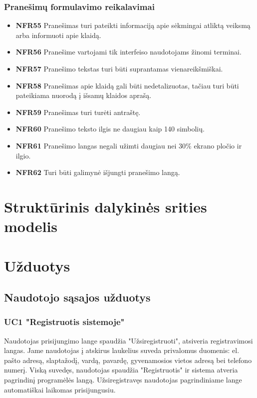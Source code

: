 \documentclass{VUMIFPSbakalaurinis}
\begin{document}
\subsubsection{Pranešimų formulavimo reikalavimai}
\begin{itemize}
	\item \textbf{NFR55} Pranešimas turi pateikti informaciją apie sėkmingai atliktą veiksmą arba informuoti apie klaidą.
	\item \textbf{NFR56} Pranešime vartojami tik interfeiso naudotojams žinomi terminai.
	\item \textbf{NFR57} Pranešimo tekstas turi būti suprantamas vienareikšmiškai.
	\item \textbf{NFR58} Pranešimas apie klaidą gali būti nedetalizuotas, tačiau turi būti pateikiama nuorodą į išsamų klaidos aprašą.
	\item \textbf{NFR59} Pranešimas turi turėti antraštę.
	\item \textbf{NFR60} Pranešimo teksto ilgis ne daugiau kaip 140 simbolių.
	\item \textbf{NFR61} Pranešimo langas negali užimti daugiau nei 30\% ekrano pločio ir ilgio.
	\item \textbf{NFR62} Turi būti galimynė išjungti pranešimo langą.
\end{itemize}

\section{Struktūrinis dalykinės srities modelis}

\section{Užduotys}
\subsection{Naudotojo sąsajos užduotys}
\subsubsection{UC1 "Registruotis sistemoje"}
Naudotojas prisijungimo lange spaudžia "Užsiregistruoti", atsiveria registravimosi langas. Jame naudotojas į atskirus laukelius suveda privalomus duomenis: el. pašto adresą, slaptažodį, vardą, pavardę, gyvenamosios vietos adresą bei telefono numerį. Viską suvedęs, naudotojas spaudžia "Registruotis" ir sistema atveria pagrindinį programėlės langą. Užsiregistravęs naudotojas pagrindiniame lange automatiškai laikomas prisijungusiu.
\end{document}
